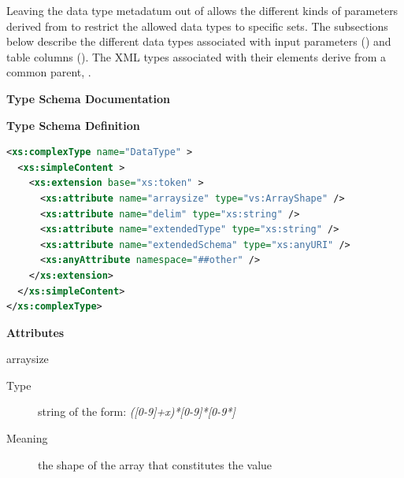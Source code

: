 \documentclass[11pt,a4paper]{ivoa}
\begin{document}

Leaving the data type metadatum out of 
allows the different kinds of parameters derived from
 to restrict the allowed data types to
specific sets.  The subsections below describe the different data
types associated with input parameters
() and table
columns ().  The
XML types associated with their  elements
derive from a common parent, .


\begin{generated}
\begingroup
      	\renewcommand*\descriptionlabel[1]{%
      	\hbox to 5.5em{\emph{#1}\hfil}}\vspace{2ex}\noindent\textbf{ Type Schema Documentation}



\vspace{1ex}\noindent\textbf{ Type Schema Definition}

\begin{lstlisting}[language=XML,basicstyle=\footnotesize]
<xs:complexType name="DataType" >
  <xs:simpleContent >
    <xs:extension base="xs:token" >
      <xs:attribute name="arraysize" type="vs:ArrayShape" />
      <xs:attribute name="delim" type="xs:string" />
      <xs:attribute name="extendedType" type="xs:string" />
      <xs:attribute name="extendedSchema" type="xs:anyURI" />
      <xs:anyAttribute namespace="##other" />
    </xs:extension>
  </xs:simpleContent>
</xs:complexType>
\end{lstlisting}

\vspace{0.5ex}\noindent\textbf{ Attributes}

\begingroup\small\begin{bigdescription}
\item[arraysize]
\begin{description}
\item[Type] string of the form: \emph{([0-9]+x)*[0-9]*[0-9*]}
\item[Meaning] 
                     the shape of the array that constitutes the value
                  

\end{description}
\end{bigdescription}
\end{generated}
\end{document}
